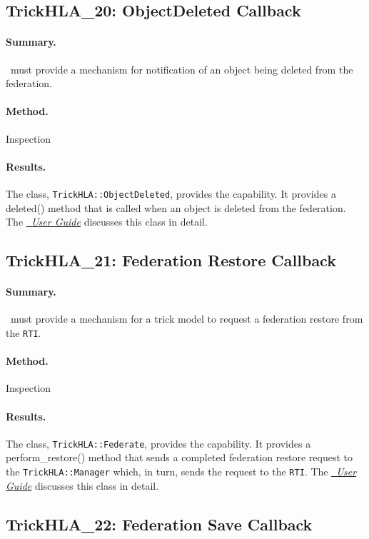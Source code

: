 \subsection{TrickHLA\_20: ObjectDeleted Callback}
\paragraph{Summary.}
\TrickHLA\ must provide a mechanism for notification of an object being 
deleted from the federation.
\paragraph{Method.} Inspection
\paragraph{Results.}
The class, {\tt TrickHLA::ObjectDeleted}, provides the capability. It 
provides a deleted() method that is called when an object is deleted from 
the federation.
The \href{file:TrickHLAUser.pdf} {\em \TrickHLA\ User Guide}
discusses this class in detail.

\subsection{TrickHLA\_21: Federation Restore Callback}
\paragraph{Summary.}
\TrickHLA\ must provide a mechanism for a trick model to request a federation
restore from the {\tt RTI}.
\paragraph{Method.} Inspection
\paragraph{Results.}
The class, {\tt TrickHLA::Federate}, provides the capability. It
provides a perform\_restore() method that sends a completed federation
restore request to the {\tt TrickHLA::Manager} which, in turn, sends the
request to the {\tt RTI}.
The \href{file:TrickHLAUser.pdf} {\em \TrickHLA\ User Guide}
discusses this class in detail.

\subsection{TrickHLA\_22: Federation Save Callback}
